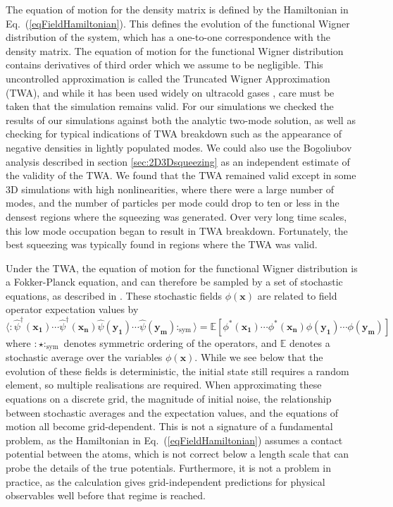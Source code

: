 \documentclass{iopart}
\begin{document}
The equation of motion for the density matrix is defined by the Hamiltonian in Eq.~(\ref{eqFieldHamiltonian}).  This defines the evolution of the functional Wigner distribution of the system, which has a one-to-one correspondence with the density matrix.  The equation of motion for the functional Wigner distribution contains derivatives of third order which we assume to be negligible.  This uncontrolled approximation is called the Truncated Wigner Approximation (TWA), and while it has been used widely on ultracold gases \cite{atomlaserWigner,orOtherUCGWigner}, care must be taken that the simulation remains valid. For our simulations we checked the results of our simulations against both the analytic two-mode solution, as well as checking for typical indications of TWA breakdown such as the appearance of negative densities in lightly populated modes.  We could also use the Bogoliubov analysis described in section \ref{sec:2D3Dsqueezing} as an independent estimate of the validity of the TWA.  We found that the TWA remained valid except in some 3D simulations with high nonlinearities, where there were a large number of modes, and the number of particles per mode could drop to ten or less in the densest regions where the squeezing was generated. Over very long time scales, this low mode occupation began to result in TWA breakdown.  Fortunately, the best squeezing was typically found in regions where the TWA was valid.

Under the TWA, the equation of motion for the functional Wigner distribution is a Fokker-Planck equation, and can therefore be sampled by a set of stochastic equations, as described in \cite{gardiner1991}.  These stochastic fields $\phi(\mathbf{x})$ are related to field operator expectation values by  
\begin{equation}
\langle :\hat{\psi}^\dagger(\mathbf{x_1})\cdots\hat{\psi}^\dagger(\mathbf{x_n})\hat{\psi}(\mathbf{y_1})\cdots\hat{\psi}(\mathbf{y_m}):_{\mbox{sym}}\rangle = \mathbb{E}\left[\phi^*(\mathbf{x_1})\cdots\phi^*(\mathbf{x_n})\phi(\mathbf{y_1})\cdots\phi(\mathbf{y_m})\right]
\label{eqExpectationRelations}
\end{equation}
%
where $:\star:_{\mbox{sym}}$ denotes symmetric ordering of the operators, and $\mathbb{E}$ denotes a stochastic average over the variables $\phi(\mathbf{x})$.  While we see below that the evolution of these fields is deterministic, the initial state still requires a random element, so multiple realisations are required.  When approximating these equations on a discrete grid, the magnitude of initial noise, the relationship between stochastic averages and the expectation values, and the equations of motion all become grid-dependent.  This is not a signature of a fundamental problem, as the Hamiltonian in Eq.~(\ref{eqFieldHamiltonian}) assumes a contact potential between the atoms, which is not correct below a length scale that can probe the details of the true potentials.  Furthermore, it is not a problem in practice, as the calculation gives grid-independent predictions for physical observables well before that regime is reached.
\end{document}
